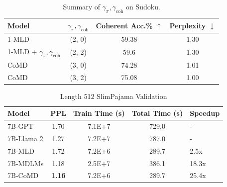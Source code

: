 \documentclass{article} %
\begin{document}
\begin{table}[!ht]
    \centering
    \caption{Summary of $\gamma_\pi,\gamma_\mathrm{coh}$ on Sudoku.}
    \label{table:time_shift}
    
    \begin{tabular}{l c c c} 
        \toprule
        \textbf{Model} & \textbf{$\gamma_\pi, \gamma_\mathrm{coh}$} & \textbf{Coherent Acc.\% $\uparrow$} & \textbf{Perplexity $\downarrow$} \\ 
        \midrule
        1-MLD & (2, 0)  & 59.38 & 1.30 \\
        1-MLD + $\gamma_\pi, \gamma_\mathrm{coh}$ & (2, 2) & 59.6 & 1.30  \\ 
        \midrule
        CoMD & (3, 0) & 74.28 & 1.01  \\
        CoMD & (3, 2) & 75.08 & 1.00   \\
        \bottomrule
    \end{tabular}
\end{table}

\begin{table}[!ht]
    \centering
    \caption{Length 512 SlimPajama Validation}
    \label{table:llm-test-llama}
    \begin{tabular}{l c c c} 
        \toprule
        \textbf{Model} & \textbf{PPL} & \textbf{Train Time (s)} & \textbf{Total Time (s)} & \textbf{Speedup} \\ 
        \midrule
        7B-GPT \citep{touvron2023llama2} & 1.70 & 7.1E+7 & 729.0 & -  \\ 
        7B-Llama 2 \citep{touvron2023llama2} & 1.27 & 7.2E+7 & 787.0 & -  \\ 
        7B-MLD \citep{austin2023structured} & 1.72 & 7.2E+6 & 289.7 & 2.5x  \\ 
        7B-MDLMs \citep{shih2022training}  & 1.18 & 2.5E+7 & 386.1 & 18.3x \\ 
        7B-CoMD   & \textbf{1.16} & 7.2E+6 & 289.7 & 25.4x \\ 
        \bottomrule
    \end{tabular}
\end{table}
\end{document}

